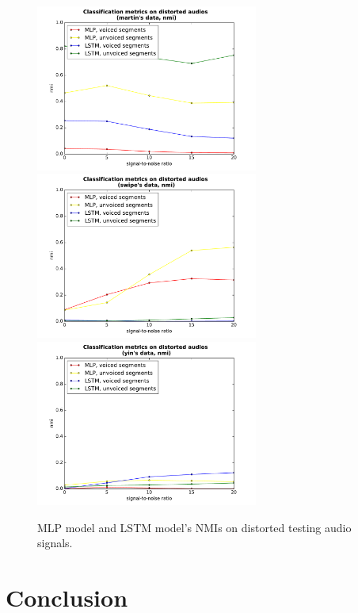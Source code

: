 \documentclass[11pt,a4paper]{report}
\begin{document}
\begin{figure}[htbp]
  \centering
  \includegraphics[width=0.65\textwidth]{classification_metrics_voicedness_martin_nmi.pdf}
  \includegraphics[width=0.65\textwidth]{classification_metrics_voicedness_swipe_nmi.pdf}
  \includegraphics[width=0.65\textwidth]{classification_metrics_voicedness_yin_nmi.pdf}
  \caption{MLP model and LSTM model's NMIs on distorted testing audio signals.}
  \label{fig:distorted-testing-data--nmi}
\end{figure}

\chapter{Conclusion}
\end{document}

